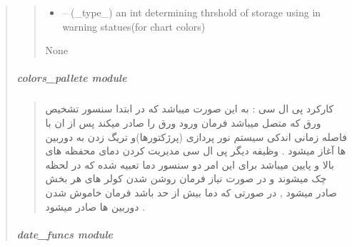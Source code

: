 \documentclass[letterpaper,10pt,english]{sphinxmanual}
\begin{document}
\begin{quote}
\begin{savenotes}
\begin{fulllineitems}
\begin{quote}
\begin{description}
\begin{itemize}
\item {} 
\sphinxAtStartPar
{} – (\_type\_) an int determining thrshold of storage using in warning statues(for chart colors)

\end{itemize}

\sphinxAtStartPar
None

\end{description}\end{quote}

\end{fulllineitems}\end{savenotes}


\sphinxstepscope


\subparagraph{colors\_pallete module}
\label{\detokenize{setting/backend/colors_pallete:colors-pallete-module}}\label{\detokenize{setting/backend/colors_pallete::doc}}\begin{quote}\begin{farsi}

\sphinxAtStartPar
کارکرد پی ال سی : به این صورت میباشد که در ابتدا سنسور تشخیص ورق که متصل میباشد فرمان ورود ورق را صادر میکند پس از ان با فاصله زمانی اندکی سیستم نور پردازی (پرژکتورها)و تریگ زدن به دوربین ها آغاز میشود . وظیفه دیگر پی ال سی مدیریت کردن دمای محفظه های بالا و پایین میباشد برای این امر دو سنسور دما تعبیه شده که در لحظه چک میشوند و در صورت نیاز فرمان روشن شدن کولر های هر بخش صادر میشود , در صورتی که دما بیش از حد باشد فرمان خاموش شدن دوربین ها صادر میشود .
\end{farsi}\end{quote}

\sphinxstepscope


\subparagraph{date\_funcs module}
\label{\detokenize{setting/backend/date_funcs:module-oxin.backend.date_funcs}}\label{\detokenize{setting/backend/date_funcs:date-funcs-module}}\label{\detokenize{setting/backend/date_funcs::doc}}


\end{quote}
\end{document}
